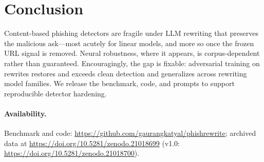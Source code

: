 \documentclass[11pt]{article}
\begin{document}
\section{Conclusion}
Content-based phishing detectors are fragile under LLM rewriting that preserves the
malicious ask---most acutely for linear models, and more so once the frozen URL
signal is removed. Neural robustness, where it appears, is corpus-dependent rather
than guaranteed. Encouragingly, the gap is fixable: adversarial training on
rewrites restores and exceeds clean detection and generalizes across rewriting
model families. We release the benchmark, code, and prompts to support reproducible
detector hardening.

\paragraph{Availability.} Benchmark and code:
\url{https://github.com/gaurangkatyal/phishrewrite}; archived data at
\url{https://doi.org/10.5281/zenodo.21018699} (v1.0:
\url{https://doi.org/10.5281/zenodo.21018700}).



\end{document}

